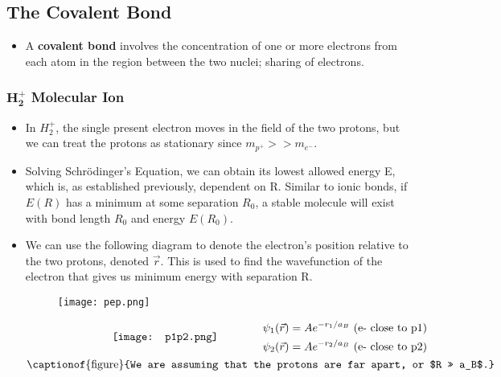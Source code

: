 \documentclass[12pt, letterpaper, twoside]{article}
\begin{document}
\subsection{The Covalent Bond}

\begin{itemize}
    \item A \textbf{covalent bond} involves the concentration of one or more electrons from each atom in the region between the two nuclei; sharing of electrons.
\end{itemize}

\subsubsection{$\mathbf{H_2^+}$ Molecular Ion}

\begin{itemize}
    \item In $H_2^+$, the single present electron moves in the field of the two protons, but we can treat the protons as stationary since $m_{p^+} >> m_{e^-}$.
    \item Solving Schr\"{o}dinger's Equation, we can obtain its lowest allowed energy E, which is, as established previously, dependent on R. Similar to ionic bonds, if $E(R)$ has a minimum at some separation $R_0$, a stable molecule will exist with bond length $R_0$ and energy $E(R_0)$. 
    \item We can use the following diagram to denote the electron's position relative to the two protons, denoted $\vec{r}$. This is used to find the wavefunction of the electron that gives us minimum energy with separation R.
    \begin{figure}[!ht]
        \centering
        \texttt{[image: pep.png]}
    \end{figure}
    \begin{align}
    \vcenter{\hbox{\texttt{[image: p1p2.png]}}}
        &\qquad\qquad
        \begin{aligned}
             \psi_1(\vec{r}) = Ae^{-r_1/a_B} \text{ (e- close to p1)}\\
             \psi_2(\vec{r}) = Ae^{-r_2/a_B} \text{ (e- close to p2)}
        \end{aligned}\\
        \vcenter{\hbox{\begin{minipage}{6cm}
        \captionof{figure}{We are assuming that the protons are far apart, or $R >> a_B$.}
        \end{minipage}}}

\end{align}
\end{itemize}
\end{document}
